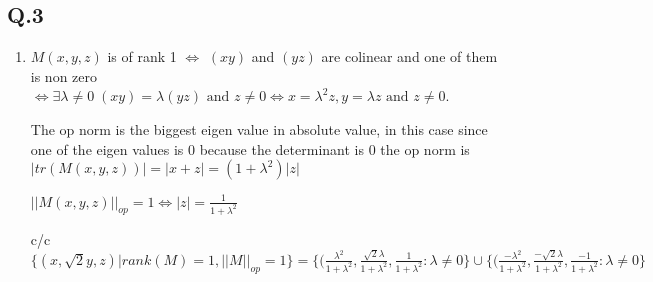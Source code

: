 \documentclass[12pt]{article}
\newcommand{\Q}[1]{\subsection*{Q.#1}}
\newenvironment{question}[1]
{\Q{#1}}{}
\begin{document}
  \begin{question}{3}
    \begin{enumerate}
    \item
      $M(x,y,z)$ is of rank 1 $\iff$ $(x y)$ and $(y z)$ are colinear and one of them is non zero  $\iff \exists \lambda \ne 0 \; (x y) = \lambda (y z) \text{ and } z \ne 0 \iff x = \lambda^2 z, y = \lambda z \text{ and } z \ne 0$.
      
      The op norm is the biggest eigen value in absolute value, in this case since one of the eigen values is 0 because the determinant is 0 the op norm is  $|tr(M(x, y, z))| = |x + z| = (1 + \lambda^2) |z|$

      $||M(x, y, z)||_{op} = 1 \iff |z| = \frac{1}{1 + \lambda^2}$

      c/c $\{ (x, \sqrt2 y, z) | rank(M) = 1, ||M||_{op} = 1 \} = \{ (\frac{\lambda^2}{1+\lambda^2}, \frac{\sqrt2 \lambda}{1+\lambda^2}, \frac 1 {1+\lambda^2} : \lambda \ne 0\} \cup\{ (\frac{-\lambda^2}{1+\lambda^2}, \frac{-\sqrt2 \lambda}{1+\lambda^2}, \frac {-1} {1+\lambda^2}: \lambda \ne 0 \} $
    \end{enumerate}
  \end{question}
\end{document}
